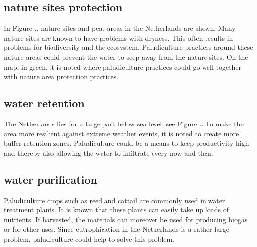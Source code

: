 \documentclass[a4paper,12pt]{scrbook}
\begin{document}
\subsection{nature sites protection}
In Figure .. nature sites and peat areas in the Netherlands are shown. Many nature sites are known to have problems with dryness. This often results in problems for biodiversity and the ecosystem. Paludiculture practices around these nature areas could prevent the water to seep away from the nature sites. On the map, in green, it is noted where paludiculture practices could go well together with nature area protection practices.

\subsection{water retention}
The Netherlands lies for a large part below sea level, see Figure .. To make the area more resilient against extreme weather events, it is noted to create more buffer retention zones. Paludiculture could be a means to keep productivity high and thereby also allowing the water to infiltrate every now and then. 

\subsection{water purification}
Paludiculture crops such as reed and cattail are commonly used in water treatment plants. It is known that these plants can easily take up loads of nutrients. If harvested, the materials can moreover be used for producing biogas or for other uses. Since eutrophication in the Netherlands is a rather large problem, paludiculture could help to solve this problem.
\end{document}
